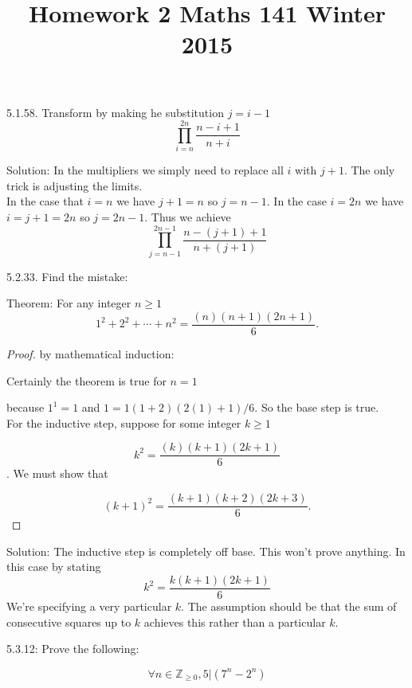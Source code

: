 \documentclass[16 pt]{amsart}
\theoremstyle{definition}
\theoremstyle{remark}
\numberwithin{equation}{subsection}
\newcommand{\Z}{\mathbb{Z}}
\begin{document}
\title{Homework 2 Maths 141 Winter 2015}
\maketitle 

5.1.58. Transform by making he substitution $j = i-1$
\[
\prod_{i=n}^{2n} \frac{n-i+1}{n+i}
\]


\vspace{1in}

Solution: In the multipliers we simply need to replace all $i$ with $j+1$.  The only trick is adjusting the limits.\\

In the case that $i=n$ we have $j+1 = n$ so $j=n-1$.  In the case $i=2n$ we have $i=j+1=2n$ so $j=2n-1$.  Thus we achieve
\[
\prod\limits_{j=n-1}^{2n-1}\frac{n-(j+1)+1}{n+(j+1)}
\]



\newpage

5.2.33. Find the mistake:

Theorem: For any integer $n \geq 1$
\[
1^2 + 2^2 + \cdots + n^2 = \frac{(n)(n+1)(2n+1)}{6}.
\]

\begin{proof} by mathematical induction:

Certainly the theorem is true for $n=1$ 

because $1^1 = 1$ and $1 = 1(1+2)(2(1)+1)/6$.  So the base step is true.\\

For the inductive step, suppose for some integer $k\geq 1$

\[
k^2 = \frac{(k)(k+1)(2k+1)}{6}
\]. 
We must show that

\[
(k+1)^2 = \frac{(k+1)(k+2)(2k+3)}{6}.
\]

\end{proof}

\vspace{1in}

Solution: The inductive step is completely off base.  This won't prove anything. In this case by stating
\[
k^2 = \frac{k(k+1)(2k+1)}{6}
\]
We're specifying a very particular $k$.  The assumption should be that the sum of consecutive squares up to $k$ achieves this rather than a particular $k$.

\newpage


5.3.12:
Prove the following:


\[
\forall n\in \Z_{\geq 0}, 5| (7^n - 2^n)
\]


\vspace{1in}
\end{document}
